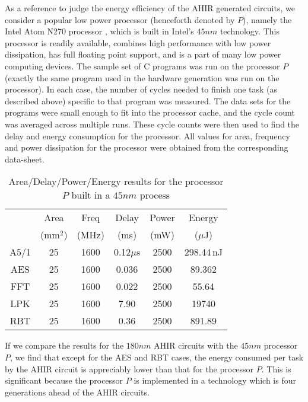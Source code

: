 \documentclass[conference]{IEEEtran}
\begin{document}
As a reference to judge the energy efficiency of
the AHIR generated circuits, we consider a 
popular low power processor (henceforth denoted
by $P$), namely the Intel Atom N270 processor \cite{ref:Atom},
%
% 
which is built in Intel's $45nm$ technology.
This processor is readily available, combines high performance
with low power dissipation, has full floating point
support, and is a part of many low power
computing devices.   
The sample set of C programs was run on the processor $P$ (exactly
the same program used in the hardware generation was run on the processor).
In each case, the number of cycles needed
to finish one task (as described above) specific to that program was measured. 
The data
sets for the programs were small enough to fit into the processor
cache, and the cycle count was averaged across multiple runs.  These
cycle counts were then used to find the delay and energy consumption
for the processor.  All values for area, frequency and
power dissipation for the processor were obtained from the
corresponding data-sheet. 

\begin{table}[htb]
  \centering
  \caption{Area/Delay/Power/Energy results for the processor $P$ built in a $45nm$ process}
  \label{table:atom-power-delay}
  \renewcommand\arraystretch{1.2}
  \setlength{\tabcolsep}{1ex}
  \begin{tabular}{c|c|c|c|c|c}
    \hline
    & Area & Freq & Delay & Power & Energy \\
    & (mm$^2$) & (MHz) & (ms) & (mW) & ($\mu$J) \\
    \hline
    \hline
    A5/1 & 25 & 1600 & 0.12$\mu$s & 2500 & 298.44\,nJ  \\
    \hline
    AES & 25 & 1600 & 0.036 & 2500 & 89.362 \\
    \hline
    FFT & 25 & 1600 & 0.022 & 2500 & 55.64  \\
    \hline
    LPK & 25 & 1600 & 7.90 & 2500 & 19740  \\
    \hline
    RBT & 25 & 1600 & 0.36 & 2500 & 891.89 \\
    \hline
  \end{tabular}

\end{table}

If we compare the results for the $180nm$ AHIR circuits with
the $45nm$ processor $P$, we find that except for the AES and
RBT cases,
the energy consumed per task by the AHIR circuit is appreciably
lower than that for the processor $P$.  This is significant
because the processor $P$ is implemented in a technology which
is four generations ahead of the AHIR circuits.  
\end{document}
